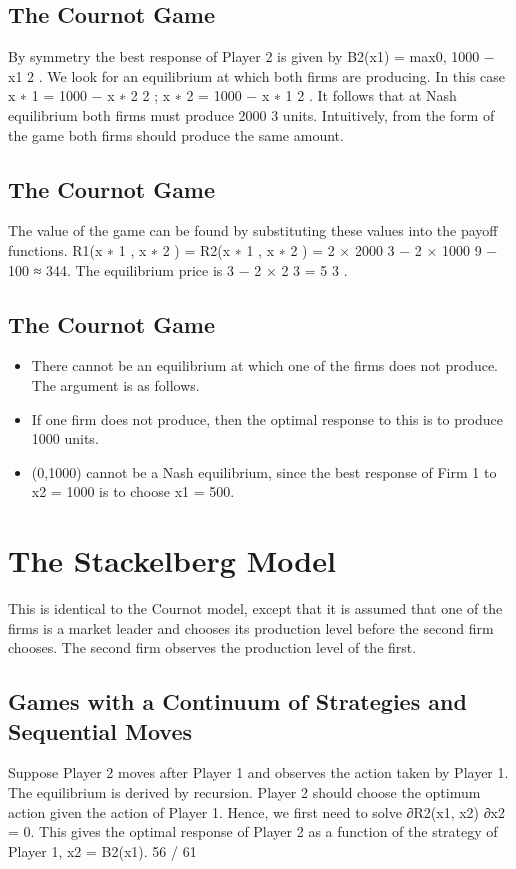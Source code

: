 \documentclass[]{report}
\begin{document}
\subsection{The Cournot Game}
By symmetry the best response of Player 2 is given by
B2(x1) = max{0, 1000 −
x1
2
}.
We look for an equilibrium at which both firms are producing. In
this case
x
∗
1 = 1000 −
x
∗
2
2
; x
∗
2 = 1000 −
x
∗
1
2
.
It follows that at Nash equilibrium both firms must produce 2000
3
units.
Intuitively, from the form of the game both firms should produce
the same amount.
\subsection{The Cournot Game}
The value of the game can be found by substituting these values
into the payoff functions.
R1(x
∗
1
, x
∗
2
) = R2(x
∗
1
, x
∗
2
) = 2 ×
2000
3
− 2 ×
1000
9
− 100 ≈ 344.
The equilibrium price is 3 − 2 ×
2
3 =
5
3
.
\subsection{The Cournot Game}
\begin{itemize}
	\item There cannot be an equilibrium at which one of the firms does not
	produce. The argument is as follows.
	\item If one firm does not produce, then the optimal response to this is
	to produce 1000 units.
	\item (0,1000) cannot be a Nash equilibrium, since the best response of
	Firm 1 to x2 = 1000 is to choose x1 = 500.
\end{itemize}

\section{The Stackelberg Model}
This is identical to the Cournot model, except that it is assumed
that one of the firms is a market leader and chooses its production
level before the second firm chooses.
The second firm observes the production level of the first.
\subsection{Games with a Continuum of Strategies and Sequential Moves}
Suppose Player 2 moves after Player 1 and observes the action
taken by Player 1. The equilibrium is derived by recursion.
Player 2 should choose the optimum action given the action of
Player 1.
Hence, we first need to solve
∂R2(x1, x2)
∂x2
= 0.
This gives the optimal response of Player 2 as a function of the
strategy of Player 1, x2 = B2(x1).
56 / 61
\end{document}
